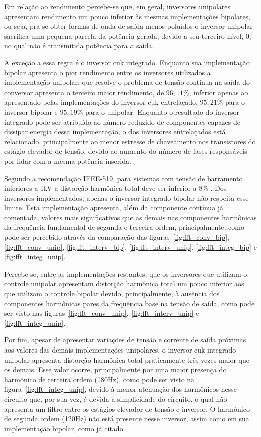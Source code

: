 \documentclass[
	12pt,				%
	openany,
	onseside,
	a4paper,			%
	english,			%
	french,				%
	spanish,			%
	brazil,				%
	]{abntex2}
\begin{document}
Em relação ao rendimento percebe-se que, em geral, inversores unipolares apresentam rendimento um pouco inferior às mesmas implementações bipolares, ou seja, pra se obter formas de onda de saída menos poluídos o inversor unipolar sacrifica uma pequena parcela da potência gerada, devido a seu terceiro nível, 0, no qual não é transmitida potência para a saída.

A exceção a essa regra é o inversor cuk integrado. Enquanto sua implementação bipolar apresenta o pior rendimento entre os inversores utilizados a implementação unipolar, que resolve o problema de tensão contínua na saída do conversor apresenta o terceiro maior rendimento, de $96,11\%$, inferior apenas ao apresentado pelas implementações do inversor cuk entrelaçado, $95,21\%$ para o inversor bipolar e $95,19\%$ para o unipolar. Enquanto o resultado do inversor integrado pode ser atribuído ao número reduzido de componentes capazes de dissipar energia dessa implementação, o dos inversores entrelaçados está relacionado, principalmente ao menor estresse de chaveamento nos transistores do estágio elevador de tensão, devido ao aumento do número de fases responsáveis por lidar com a mesma potência inserida.

Segundo a recomendação IEEE-519, para sistemas com tensão de barramento inferiores a 1kV a distorção harmônica total deve ser inferior a $8\%$ \cite{IEEE_519}. Dos inversores implementados, apenas o inversor integrado bipolar não respeita esse limite. Esta implementação apresenta, além da componente contínua já comentada, valores mais significativos que as demais nas componentes harmônicas da frequência fundamental de segunda e terceira ordem, principalmente, como pode ser percebido através da comparação das figuras~\ref{fig:fft_conv_bip}, \ref{fig:fft_conv_unip}, \ref{fig:fft_interv_bip}, \ref{fig:fft_interv_unip}, \ref{fig:fft_integ_bip} e \ref{fig:fft_integ_unip}. 

Percebe-se, entre as implementações restantes, que os inversores que utilizam o controle unipolar apresentam distorção harmônica total um pouco inferior aos que utilizam o controle bipolar devido, principalmente, à ausência dos componentes harmônicas pares da frequência base na tensão de saída, como pode ser visto nas figuras~\ref{fig:fft_conv_unip}, \ref{fig:fft_interv_unip} e \ref{fig:fft_integ_unip}.

Por fim, apesar de apresentar variações de tensão e corrente de saída próximas aos valores das demais implementações unipolares, o inversor cuk integrado unipolar apresenta distorção harmônica total praticamente três vezes maior que os demais. Esse valor ocorre, principalmente por uma maior presença do harmônico de terceira ordem (180Hz), como pode ser visto na figura~\ref{fig:fft_integ_unip}, devido à menor atenuação dos harmônicos nesse circuito que, por sua vez, é devida à simplicidade do circuito, o qual não apresenta um filtro entre os estágios elevador de tensão e inversor. O harmônico de segunda ordem (120Hz) não está presente nesse inversor, assim como em sua implementação bipolar, como já citado.
\end{document}

